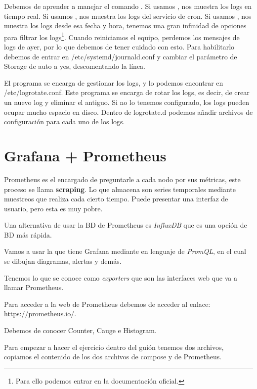 Debemos de aprender a manejar el comando . Si usamos , nos muestra los logs en tiempo real. Si usamos , nos muestra los logs del servicio de cron. Si usamos , nos muestra los logs desde esa fecha y hora, tenemos una gran infinidad de opciones para filtrar los logs\footnote{Para ello podemos entrar en la documentación oficial.}. Cuando reiniciamos el equipo, perdemos los mensajes de logs de ayer, por lo que debemos de tener cuidado con esto. Para habilitarlo debemos de entrar en /etc/systemd/journald.conf y cambiar el parámetro de Storage de auto a yes, descomentando la línea. 

El programa  se encarga de gestionar los logs, y lo podemos encontrar en /etc/logrotate.conf. Este programa se encarga de rotar los logs, es decir, de crear un nuevo log y eliminar el antiguo. Si no lo tenemos configurado, los logs pueden ocupar mucho espacio en disco. Dentro de logrotate.d podemos añadir archivos de configuración para cada uno de los logs.


\section{Grafana + Prometheus}

Prometheus es el encargado de preguntarle a cada nodo por sus métricas, este proceso se llama \textbf{scraping}. Lo que almacena son series temporales mediante muestreos que realiza cada cierto tiempo. Puede presentar una interfaz de usuario, pero esta es muy pobre.

Una alternativa de usar la BD de Prometheus es \textit{InfluxDB} que es una opción de BD más rápida.

Vamos a usar la que tiene Grafana mediante en lenguaje de\textit{ PromQL}, en el cual se dibujan diagramas, alertas y demás.

Tenemos lo que se conoce como \textit{exporters} que son las interfaces web que va a llamar Prometheus.

Para acceder a la web de Prometheus debemos de acceder al enlace: \url{https://prometheus.io/}.

Debemos de conocer Counter, Cauge e Histogram.

Para empezar a hacer el ejercicio dentro del guión tenemos dos archivos, copiamos el contenido de los dos archivos de compose y de Prometheus. 

